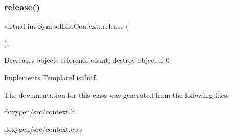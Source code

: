 \mbox{\label{class_symbol_list_context_ab793c4223391f4cf6c04c0e35af654f6}} 
\subsubsection{\texorpdfstring{release()}{release()}}
{\footnotesize\ttfamily virtual int Symbol\+List\+Context\+::release (\begin{DoxyParamCaption}{ }\end{DoxyParamCaption})\hspace{0.3cm}{\ttfamily [inline]}, {\ttfamily [virtual]}}

Decreases object\textquotesingle{}s reference count, destroy object if 0 

Implements \mbox{\hyperlink{class_template_list_intf_a0c53169c740c09dac47efc62bbe39674}{Template\+List\+Intf}}.



The documentation for this class was generated from the following files\+:\begin{DoxyCompactItemize}
\item 
doxygen/src/context.\+h\item 
doxygen/src/context.\+cpp\end{DoxyCompactItemize}
